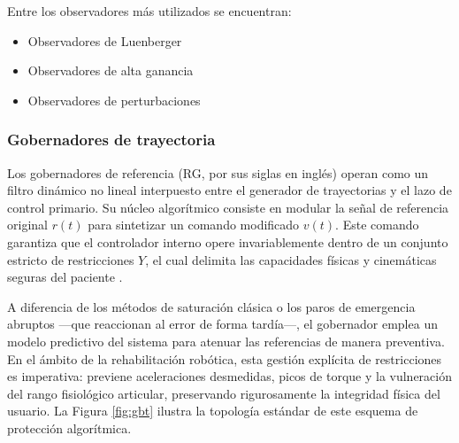 \documentclass[a4paper,12pt]{article}
\begin{document}
Entre los observadores más utilizados se encuentran:
\begin{itemize}
    \item Observadores de Luenberger
    \item Observadores de alta ganancia
    \item Observadores de perturbaciones
\end{itemize}





\subsubsection{Gobernadores de trayectoria}

Los gobernadores de referencia (RG, por sus siglas en inglés) operan como un filtro dinámico no lineal interpuesto entre el generador de trayectorias y el lazo de control primario. Su núcleo algorítmico consiste en modular la señal de referencia original $r(t)$ para sintetizar un comando modificado $v(t)$. Este comando garantiza que el controlador interno opere invariablemente dentro de un conjunto estricto de restricciones $Y$, el cual delimita las capacidades físicas y cinemáticas seguras del paciente \citep{garone2017reference}.

A diferencia de los métodos de saturación clásica o los paros de emergencia abruptos —que reaccionan al error de forma tardía—, el gobernador emplea un modelo predictivo del sistema para atenuar las referencias de manera preventiva. En el ámbito de la rehabilitación robótica, esta gestión explícita de restricciones es imperativa: previene aceleraciones desmedidas, picos de torque y la vulneración del rango fisiológico articular, preservando rigurosamente la integridad física del usuario. La Figura \ref{fig:gbt} ilustra la topología estándar de este esquema de protección algorítmica.
\end{document}
